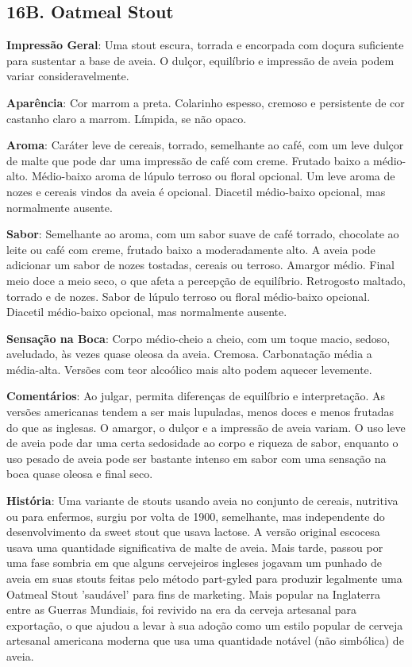 \subsection*{16B. Oatmeal Stout}

\textbf{Impressão Geral}: Uma stout escura, torrada e encorpada com doçura suficiente para sustentar a base de aveia. O dulçor, equilíbrio e impressão de aveia podem variar consideravelmente.

\textbf{Aparência}: Cor marrom a preta. Colarinho espesso, cremoso e persistente de cor castanho claro a marrom. Límpida, se não opaco.

\textbf{Aroma}: Caráter leve de cereais, torrado, semelhante ao café, com um leve dulçor de malte que pode dar uma impressão de café com creme. Frutado baixo a médio-alto. Médio-baixo aroma de lúpulo terroso ou floral opcional. Um leve aroma de nozes e cereais vindos da aveia é opcional. Diacetil médio-baixo opcional, mas normalmente ausente.

\textbf{Sabor}: Semelhante ao aroma, com um sabor suave de café torrado, chocolate ao leite ou café com creme, frutado baixo a moderadamente alto. A aveia pode adicionar um sabor de nozes tostadas, cereais ou terroso. Amargor médio. Final meio doce a meio seco, o que afeta a percepção de equilíbrio. Retrogosto maltado, torrado e de nozes. Sabor de lúpulo terroso ou floral médio-baixo opcional. Diacetil médio-baixo opcional, mas normalmente ausente.

\textbf{Sensação na Boca}: Corpo médio-cheio a cheio, com um toque macio, sedoso, aveludado, às vezes quase oleosa da aveia. Cremosa. Carbonatação média a média-alta. Versões com teor alcoólico mais alto podem aquecer levemente.

\textbf{Comentários}: Ao julgar, permita diferenças de equilíbrio e interpretação. As versões americanas tendem a ser mais lupuladas, menos doces e menos frutadas do que as inglesas. O amargor, o dulçor e a impressão de aveia variam. O uso leve de aveia pode dar uma certa sedosidade ao corpo e riqueza de sabor, enquanto o uso pesado de aveia pode ser bastante intenso em sabor com uma sensação na boca quase oleosa e final seco.

\textbf{História}: Uma variante de stouts usando aveia no conjunto de cereais, nutritiva ou para enfermos, surgiu por volta de 1900, semelhante, mas independente do desenvolvimento da sweet stout que usava lactose. A versão original escocesa usava uma quantidade significativa de malte de aveia. Mais tarde, passou por uma fase sombria em que alguns cervejeiros ingleses jogavam um punhado de aveia em suas stouts feitas pelo método part-gyled para produzir legalmente uma Oatmeal Stout 'saudável' para fins de marketing. Mais popular na Inglaterra entre as Guerras Mundiais, foi revivido na era da cerveja artesanal para exportação, o que ajudou a levar à sua adoção como um estilo popular de cerveja artesanal americana moderna que usa uma quantidade notável (não simbólica) de aveia.


